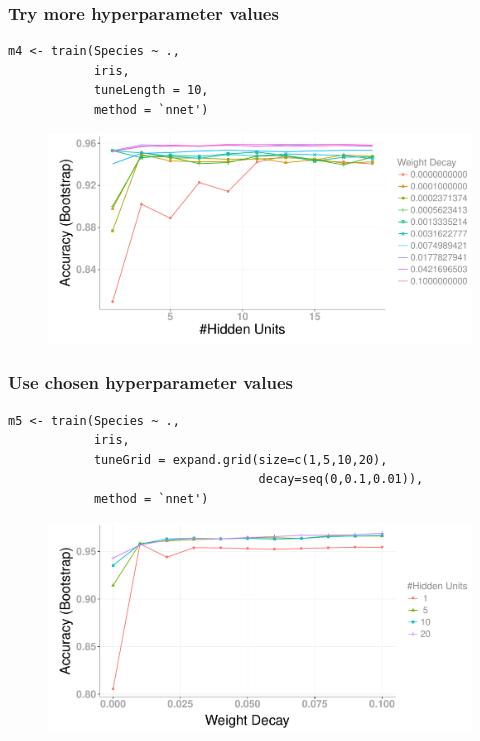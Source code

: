 \documentclass[handout, aspectratio = 169]{beamer}
\begin{document}
\begin{frame}[fragile]
\frametitle{Try more hyperparameter values}
\renewcommand{\FancyVerbFormatLine}[1]{%
   \ifnum\value{FancyVerbLine}=3\color{cyan}#1%
   \else #1\fi}

\begin{Verbatim}
m4 <- train(Species ~ ., 
            iris,
            tuneLength = 10,
            method = `nnet')
\end{Verbatim}

\begin{figure}
    \includegraphics[height = 0.5\textheight]{train_nnet_tuneLength}
\end{figure} 
\end{frame} 





\begin{frame}[fragile]
\frametitle{Use chosen hyperparameter values}
\renewcommand{\FancyVerbFormatLine}[1]{%
   \ifnum\value{FancyVerbLine}=3\color{cyan}#1%
   \else%
   \ifnum\value{FancyVerbLine}=4\color{cyan}#1%
   \else #1\fi\fi}

\begin{Verbatim}
m5 <- train(Species ~ ., 
            iris,
            tuneGrid = expand.grid(size=c(1,5,10,20), 
                                   decay=seq(0,0.1,0.01)),
            method = `nnet')
\end{Verbatim}

\begin{figure}
    \includegraphics[height = 0.5\textheight]{train_nnet_tuneGrid}
\end{figure} 
\end{frame} 
\end{document}
